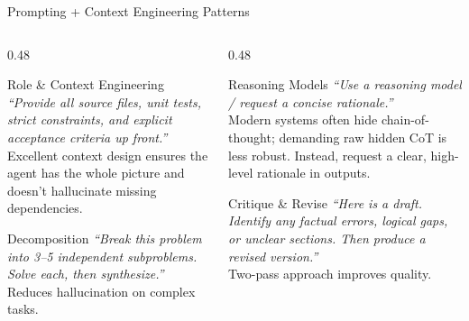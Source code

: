 \begin{frame}{Prompting + Context Engineering Patterns}
  \begin{columns}[T, onlytextwidth]
    \begin{column}{0.48\textwidth}
      \begin{block}{Role \& Context Engineering}
        \small\textit{``Provide all source files, unit tests, strict constraints, and explicit acceptance criteria up front.''}\\[0.2em]
        Excellent context design ensures the agent has the whole picture and doesn't hallucinate missing dependencies.
      \end{block}
      \vspace{0.4em}
      \begin{block}{Decomposition}
        \small\textit{``Break this problem into 3--5 independent subproblems. Solve each, then synthesize.''}\\[0.2em]
        Reduces hallucination on complex tasks.~\parencite{wei2022cot}
      \end{block}
    \end{column}
    \hfill
    \begin{column}{0.48\textwidth}
      \begin{block}{Reasoning Models}
        \small\textit{``Use a reasoning model / request a concise rationale.''}\\[0.2em]
        Modern systems often hide chain-of-thought; demanding raw hidden CoT is less robust. Instead, request a clear, high-level rationale in outputs.
      \end{block}
      \vspace{0.4em}
      \begin{block}{Critique \& Revise}
        \small\textit{``Here is a draft. Identify any factual errors, logical gaps, or unclear sections. Then produce a revised version.''}\\[0.2em]
        Two-pass approach improves quality.
      \end{block}
    \end{column}
  \end{columns}
\end{frame}

